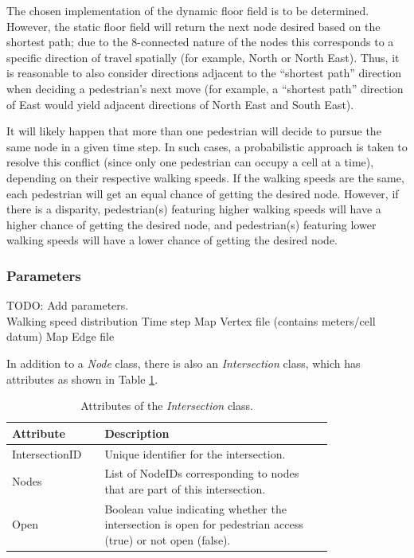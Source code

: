 \documentclass[12pt]{article}
\begin{document}
The chosen implementation of the dynamic floor field is to be determined.  However, the static floor field will return the next node desired based on the shortest path; due to the 8-connected nature of the nodes this corresponds to a specific direction of travel spatially (for example, North or North East).  Thus, it is reasonable to also consider directions adjacent to the “shortest path” direction when deciding a pedestrian’s next move (for example, a “shortest path” direction of East would yield adjacent directions of North East and South East).

It will likely happen that more than one pedestrian will decide to pursue the same node in a given time step.  In such cases, a probabilistic approach is taken to resolve this conflict (since only one pedestrian can occupy a cell at a time), depending on their respective walking speeds.  If the walking speeds are the same, each pedestrian will get an equal chance of getting the desired node.  However, if there is a disparity, pedestrian(s) featuring higher walking speeds will have a higher chance of getting the desired node, and pedestrian(s) featuring lower walking speeds will have a lower chance of getting the desired node.

\subsubsection{Parameters}

TODO: Add parameters.\\
Walking speed distribution
Time step
Map Vertex file (contains meters/cell datum)
Map Edge file


In addition to a \textit{Node} class, there is also an \textit{Intersection} class, which has attributes as shown in Table \ref{table:intersection}.

\def\arraystretch{1.5}
\begin{table}[hb!]
  \centering
    \begin{tabular}{p{0.2\linewidth}p{0.6\linewidth}}
     \hline
     Attribute & Description \\
     \hline
     IntersectionID      & Unique identifier for the intersection. \\
     Nodes & List of NodeIDs corresponding to nodes that are part of this intersection. \\
     Open & Boolean value indicating whether the intersection is open for pedestrian access (true) or not open (false). \\
     \hline
    \end{tabular}
    \caption{Attributes of the \textit{Intersection} class.}
  \label{table:intersection}
\end{table}
\end{document}
